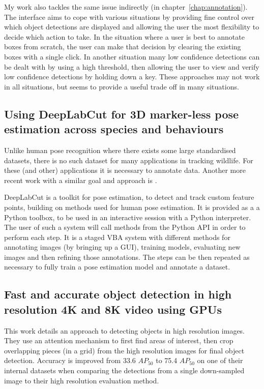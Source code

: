 My work also tackles the same issue indirectly (in chapter~\ref{chap:annotation}). The interface aims to cope with various situations by providing fine control over which object detections are displayed and allowing the user the most flexibility to decide which action to take. In the situation where a user is best to annotate boxes from scratch, the user can make that decision by clearing the existing boxes with a single click. In another situation many low confidence detections can be dealt with by using a high threshold, then allowing the user to view and verify low confidence detections by holding down a key. These approaches may not work in all situations, but seems to provide a useful trade off in many situations.

\subsection {Using DeepLabCut for 3D marker-less pose estimation across species and behaviours \cite{Nath2018, Mathis2018}}

Unlike human pose recognition where there exists some large standardised datasets, there is no such dataset for many applications in tracking wildlife. For these (and other) applications it is necessary to annotate data. Another more recent work with a similar goal and approach is \cite{Graving2019}.

DeepLabCut is a toolkit for pose estimation, to detect and track custom feature points, building on methods used for human pose estimation. It is provided as a a Python toolbox, to be used in an interactive session with a Python interpreter. The user of such a system will call methods from the Python \gls{API} in order to perform each step. It is a staged \gls{VBA} system with different methods for annotating images (by bringing up a GUI), training models, evaluating new images and then refining those annotations. The steps can be then repeated as necessary to fully train a pose estimation model and annotate a dataset. 

\subsection{Fast and accurate object detection in high resolution 4K and 8K video using GPUs \cite{Ruzicka2018}}

This work details an approach to detecting objects in high resolution images. They use an attention mechanism to first find areas of interest, then crop overlapping pieces (in a grid) from the high resolution images for final object detection. Accuracy is improved from 33.6 $AP_{50}$ to 75.4 $AP_{50}$ on one of their internal datasets when comparing the detections from a single down-sampled image to their high resolution evaluation method. 

